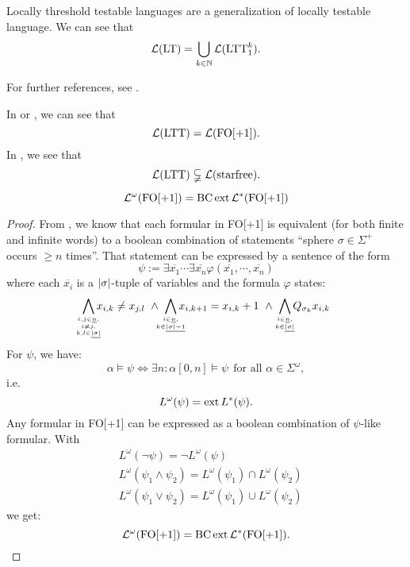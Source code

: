 Locally threshold testable languages are a generalization of locally testable language. We can see that
\[  \mathcal{L}(\textup{\textrm{LT}}) = \bigcup_{k\in\mathbb{N}} \mathcal{L}(\text{LTT}^k_1) . \]

For further references, see \cite[IV.3]{FinAutLogR109}.

In \cite[IV.3.3]{FinAutLogR109} or \cite[Corollary 4.9]{LangAutLogicR102}, we can see that
\[  \mathcal{L}(\text{LTT}) = \mathcal{L}(\mathrm{FO[+1]}). \]
In \cite[IV.3.4]{FinAutLogR109}, we see that
\[  \mathcal{L}(\text{LTT}) \subsetneqq \mathcal{L}(\textup{\textrm{starfree}}). \]



\begin{theorem}
\[ \mathcal{L}^\omega (\mathrm{FO[+1]}) = \operatorname{BC} \operatorname{ext} \mathcal{L}^*(\mathrm{FO[+1]}) \]
\begin{proof}
From \cite[Theorem 4.8]{LangAutLogicR102}, we know that each formular in FO[+1] is equivalent (for both finite and infinite words) to a boolean combination of statements ``sphere $\sigma \in \Sigma^+$ occurs $\geq n$ times''. That statement can be expressed by a sentence of the form
\[ \psi := \exists \overline{x_1} \dotsb \exists \overline{x_n} \varphi(\overline{x_1}, \dotsb, \overline{x_n}) \]
where each $\overline{x_i}$ is a $\left| \sigma \right|$-tuple of variables and the formula $\varphi$ states:
\[
\bigwedge_{\mathclap{i,j \in \underline{n},\atop { i \neq j,\atop k,l \in \underline{\abs{\sigma}}}}} x_{i,k} \neq x_{j,l}
\ \wedge\ \bigwedge_{\mathclap{i \in \underline{n},\atop k \in \underline{\abs{\sigma}-1}}} x_{i,k+1} = x_{i,k} + 1
\ \wedge\ \bigwedge_{\mathclap{i \in \underline{n},\atop k \in \underline{\abs{\sigma}}}} Q_{\sigma_k} x_{i,k}
\]
For $\psi$, we have:
\[ \alpha \models \psi \Leftrightarrow \exists n \colon \alpha[0,n] \models \psi \ \ \text{for all } \alpha \in \Sigma^\omega , \]
i.e.
\[ L^\omega(\psi) = \operatorname{ext} L^*(\psi) . \]
Any formular in FO[+1] can be expressed as a boolean combination of $\psi$-like formular. With
\begin{align*}
& L^\omega(\neg \psi) = \neg L^\omega(\psi) \\
& L^\omega(\psi_1 \wedge \psi_2) = L^\omega(\psi_1) \cap L^\omega(\psi_2) \\
& L^\omega(\psi_1 \vee \psi_2) = L^\omega(\psi_1) \cup L^\omega(\psi_2)
\end{align*}
we get:
\[ \mathcal{L}^\omega(\mathrm{FO[+1]}) = \operatorname{BC} \operatorname{ext} \mathcal{L}^*(\mathrm{FO[+1]}). \]
\end{proof}
\end{theorem}

